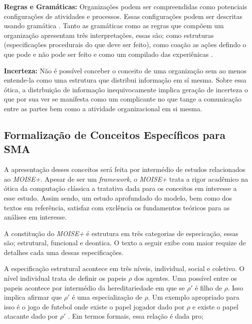 \textbf{Regras e Gramáticas:} Organizações podem ser compreendidas como potenciais configurações de atividades e processos. Essas configurações podem ser descritas usando gramática \cite{grammarselforganizationmodel} 
\cite{grammarselforganizationmodel2}. Tanto as gramáticas como as regras que compõem um organização apresentam três interpretações, essas são; como estruturas (especificações procedurais do que deve 
ser feito), como coação as ações defindo o que pode e não pode ser feito e como um compilado das experiênicas \cite{organiationofmultiagentsystem}.

\textbf{Incerteza:} Não é possível conceber o conceito de uma organização sem ao menos entende-la como uma estrutura que distribui informação em sí mesma. Sobre essa ótica, a distrbuição de informação
inequivocamente implica geração de incerteza o que por sua ver se manifesta como um complicante no que tange a comunicação entre as partes bem como a atividade organizacional em si mesma.

\subsection{Formalização de Conceitos Específicos para SMA}
\label{moiseformalizesma}
A apresentação desses conceitos será feita por intermédio de estudos relacionados ao \textit{MOISE+}. Apesar de ser um \textit{framework}, o \textit{MOISE+} trata a rigor acadêmico na ótica
da computação clássica a tratativa dada para os conceitos em interesse a esse estudo. Assim sendo, um estudo aprofundado do modelo, bem como dos textos em referência, satisfaz com exclência 
os fundamentos teóricos para as análises em interesse. 

A constitução do \textit{MOISE+} é estrutura em três categorias de especicação, essas são; estrutural, funcional e deontica. O texto a seguir exibe com maior requize de detalhes cada uma dessas
especificações.  

A especificação estrutural acontece em três níveis, individual, social e coletivo. O nível individual trata de definir os papeis $\rho$ dos agentes. Uma possível entre os papeis acontece por 
intermédio da hereditariedade em que se $\rho'$ é filho de $\rho$. Isso implica afirmar que $\rho'$ é uma especialização de $\rho$. Um exemplo apropriado para isso é o jogo de futebol onde 
existe o papel jogador dado por $\rho$ e existe o papel atacante dado por $\rho'$ \cite{moiseframework} \cite{roleone} \cite{roletwo} \cite{dynamicagenttemporalstruct}. Em termos formais, essa relação é dada pro; 

